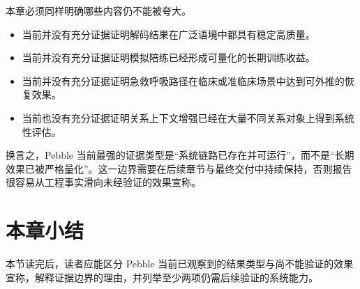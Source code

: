 本章必须同样明确哪些内容仍不能被夸大。

\begin{itemize}
  \item 当前并没有充分证据证明解码结果在广泛语境中都具有稳定高质量。
  \item 当前并没有充分证据证明模拟陪练已经形成可量化的长期训练收益。
  \item 当前并没有充分证据证明急救呼吸路径在临床或准临床场景中达到可外推的恢复效果。
  \item 当前也没有充分证据证明关系上下文增强已经在大量不同关系对象上得到系统性评估。
\end{itemize}

换言之，Pebble 当前最强的证据类型是“系统链路已存在并可运行”，而不是“长期效果已被严格量化”。这一边界需要在后续章节与最终交付中持续保持，否则报告很容易从工程事实滑向未经验证的效果宣称。

\section{本章小结}

本节读完后，读者应能区分 Pebble 当前已观察到的结果类型与尚不能验证的效果宣称，解释证据边界的理由，并列举至少两项仍需后续验证的系统能力。
